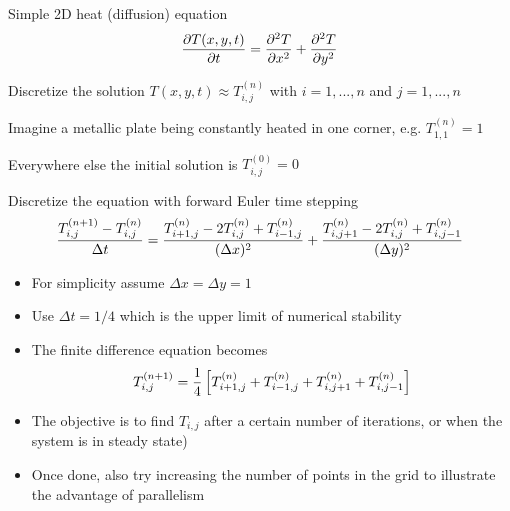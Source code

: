 \newcommand{\tnij}{\ensuremath{T^{(n)}_{i,j}}}

\begin{frame}{}
  \begin{itemize}\setlength{\itemsep}{3mm}
    \item Simple 2D heat (diffusion) equation
    \[
      {\partial T(x,y,t)\over\partial t}={\partial^2 T\over\partial x^2}+{\partial^2 T\over\partial y^2}
    \]
    {\footnotesize
      \item Discretize the solution $T(x,y,t)\approx T^{(n)}_{i,j}$ with $i=1,...,n$ and $j=1,...,n$
      \item Imagine a metallic plate being constantly heated in one corner, e.g. $T^{(n)}_{1,1}=1$
      \item Everywhere else the initial solution is $T^{(0)}_{i,j}=0$}
    \item Discretize the equation with forward Euler time stepping
    \[
      {T^{(n+1)}_{i,j}-\tnij\over\Delta t}=
      {T^{(n)}_{i+1,j}-2T^{(n)}_{i,j}+T^{(n)}_{i-1,j}\over(\Delta x)^2}+
      {T^{(n)}_{i,j+1}-2T^{(n)}_{i,j}+T^{(n)}_{i,j-1}\over(\Delta y)^2}
    \]
  \end{itemize}
\end{frame}

\begin{frame}{}
  \begin{itemize}\setlength{\itemsep}{3mm}
    \item For simplicity assume $\Delta x=\Delta y=1$
    \item Use $\Delta t=1/4$ which is the upper limit of numerical stability
    \item The finite difference equation becomes
    \[
      T^{(n+1)}_{i,j} = {1\over4}\left[T^{(n)}_{i+1,j}+T^{(n)}_{i-1,j}+T^{(n)}_{i,j+1}+T^{(n)}_{i,j-1}\right]
    \]
    \item The objective is to find $T_{i,j}$ after a
    certain number of iterations, or when the system is in steady state)
    \item Once done, also try increasing the number of points in the grid to illustrate the advantage of
    parallelism
  \end{itemize}
\end{frame}
